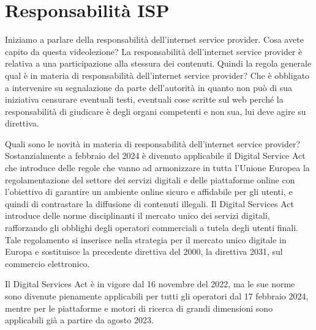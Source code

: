 \chapter{Responsabilità ISP}

Iniziamo a parlare della responsabilità dell'internet service provider.
Cosa avete capito da questa videolezione?
La responsabilità dell'internet service provider è relativa a una participazione alla stessura dei contenuti.
Quindi la regola generale qual è in materia di responsabilità dell'internet service provider?
Che è obbligato a intervenire su segnalazione da parte dell'autorità in quanto non può di sua iniziativa censurare eventuali testi, eventuali cose scritte sul web perché la responsabilità di giudicare è degli organi competenti e non sua, lui deve agire su direttiva.




Quali sono le novità in materia di responsabilità dell'internet service provider?
Sostanzialmente a febbraio del 2024 è divenuto applicabile il Digital Service Act che introduce delle regole che vanno ad armonizzare in tutta l'Unione Europea la regolamentazione del settore dei servizi digitali e delle piattaforme online con l'obiettivo di garantire un ambiente online sicuro e affidabile per gli utenti, e quindi di contrastare la diffusione di contenuti illegali.
Il Digital Services Act introduce delle norme disciplinanti il mercato unico dei servizi digitali, rafforzando gli obblighi degli operatori commerciali a tutela degli utenti finali.
Tale regolamento si inserisce nella strategia per il mercato unico digitale in Europa e sostituisce la precedente direttiva del 2000, la direttiva 2031, sul commercio elettronico.

Il Digital Services Act è in vigore dal 16 novembre del 2022, ma le sue norme sono divenute pienamente applicabili per tutti gli operatori dal 17 febbraio 2024, mentre per le piattaforme e motori di ricerca di grandi dimensioni sono applicabili già a partire da agosto 2023.

